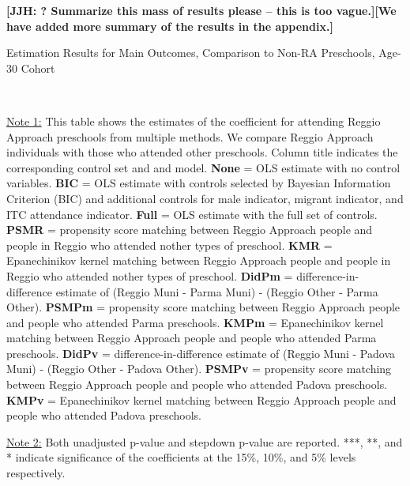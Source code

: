 \textbf{[JJH: ? Summarize this mass of results please -- this is too vague.][We have added more summary of the results in the appendix.]}



\begin{table}[H] \caption{Estimation Results for Main Outcomes, Comparison to Non-RA Preschools, Age-30 Cohort} \label{ols-M-adult30-reg-pres}
\scalebox{0.6}{}
\vspace{1ex} \\
\footnotesize\raggedright{\underline{Note 1:} This table shows the estimates of the coefficient for attending Reggio Approach preschools from multiple methods. We compare Reggio Approach individuals with those who attended other preschools. Column title indicates the corresponding control set and and model. \textbf{None} = OLS estimate with no control variables. \textbf{BIC} = OLS estimate with controls selected by Bayesian Information Criterion (BIC) and additional controls for male indicator, migrant indicator, and ITC attendance indicator. \textbf{Full} = OLS estimate with the full set of controls. \textbf{PSMR} =  propensity score matching between Reggio Approach people and people in Reggio who attended nother types of preschool. \textbf{KMR} = Epanechinikov kernel matching between Reggio Approach people and people in Reggio who attended nother types of preschool. \textbf{DidPm} = difference-in-difference estimate of (Reggio Muni - Parma Muni) - (Reggio Other - Parma Other). \textbf{PSMPm} = propensity score matching between Reggio Approach people and people who attended Parma preschools. \textbf{KMPm} = Epanechinikov kernel matching between Reggio Approach people and people who attended Parma preschools. \textbf{DidPv} = difference-in-difference estimate of (Reggio Muni - Padova Muni) - (Reggio Other - Padova Other). \textbf{PSMPv} = propensity score matching between Reggio Approach people and people who attended Padova preschools. \textbf{KMPv} = Epanechinikov kernel matching between Reggio Approach people and people who attended Padova preschools.} 

\footnotesize\raggedright{\underline{Note 2:} Both unadjusted p-value and stepdown p-value are reported. ***, **, and * indicate significance of the coefficients at the 15\%, 10\%, and 5\% levels respectively.}
\end{table}

